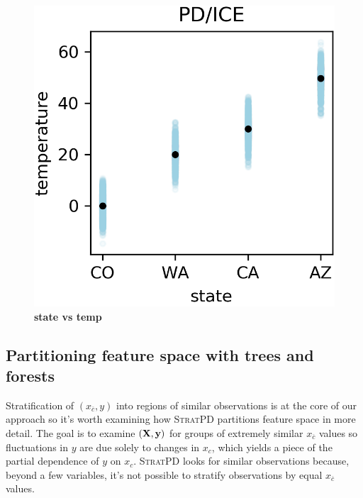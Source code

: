 \documentclass[12pt]{article}
\newcommand{\spd}{\fontfamily{cmr}\textsc{\small StratPD}}
\newcommand{\xnc}{$x_{\overline{c}}$}
\begin{document}
\begin{figure}[htbp]
\begin{center}
\includegraphics[scale=0.7]{images/state_vs_temp_pdp.png}
\caption{{\bf  state  vs temp}}
\label{fig:state_vs_temp}
\end{center}
\end{figure}

\subsection{Partitioning feature space with trees and forests}

Stratification of $(x_{\overline{c}}, y)$ into regions of similar observations is at the core of our approach so it's worth examining how \spd{} partitions feature space in more detail.  The goal is to examine $({\bf X}, {\bf y})$ for groups of extremely similar \xnc{} values so fluctuations in $y$ are due solely to changes in $x_c$, which yields a piece of the partial dependence of $y$ on $x_c$. \spd{} looks for similar observations because, beyond a few variables, it's not possible to stratify observations by equal \xnc{} values. 
\end{document}
